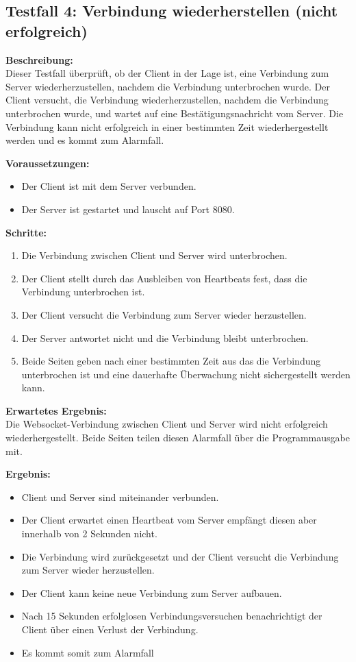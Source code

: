 \documentclass[thesis.tex]{subfiles}
\begin{document}
\subsection*{Testfall 4: Verbindung wiederherstellen (nicht erfolgreich)}

\textbf{Beschreibung:}\\
Dieser Testfall überprüft, ob der Client in der Lage ist, eine Verbindung zum Server wiederherzustellen, nachdem die Verbindung unterbrochen wurde. Der Client versucht, die Verbindung wiederherzustellen, nachdem die Verbindung unterbrochen wurde, und wartet auf eine Bestätigungsnachricht vom Server. Die Verbindung kann nicht erfolgreich in einer bestimmten Zeit wiederhergestellt werden und es kommt zum Alarmfall.

\textbf{Voraussetzungen:}
\begin{itemize}
    \item Der Client ist mit dem Server verbunden.
    \item Der Server ist gestartet und lauscht auf Port 8080.
\end{itemize}

\textbf{Schritte:}
\begin{enumerate}
    \item Die Verbindung zwischen Client und Server wird unterbrochen.
    \item Der Client stellt durch das Ausbleiben von Heartbeats fest, dass die Verbindung unterbrochen ist.
    \item Der Client versucht die Verbindung zum Server wieder herzustellen.
    \item Der Server antwortet nicht und die Verbindung bleibt unterbrochen.
    \item Beide Seiten geben nach einer bestimmten Zeit aus das die Verbindung unterbrochen ist und eine dauerhafte Überwachung nicht sichergestellt werden kann.
\end{enumerate}

\textbf{Erwartetes Ergebnis:}\\
Die Websocket-Verbindung zwischen Client und Server wird nicht erfolgreich wiederhergestellt. Beide Seiten teilen diesen Alarmfall über die Programmausgabe mit.

\textbf{Ergebnis:}
\begin{itemize}
    \item Client und Server sind miteinander verbunden.
    \item Der Client erwartet einen Heartbeat vom Server empfängt diesen aber innerhalb von 2 Sekunden nicht.
    \item Die Verbindung wird zurückgesetzt und der Client versucht die Verbindung zum Server wieder herzustellen.
    \item Der Client kann keine neue Verbindung zum Server aufbauen.
    \item Nach 15 Sekunden erfolglosen Verbindungsversuchen benachrichtigt der Client über einen Verlust der Verbindung.
    \item Es kommt somit zum Alarmfall
\end{itemize}
\end{document}

